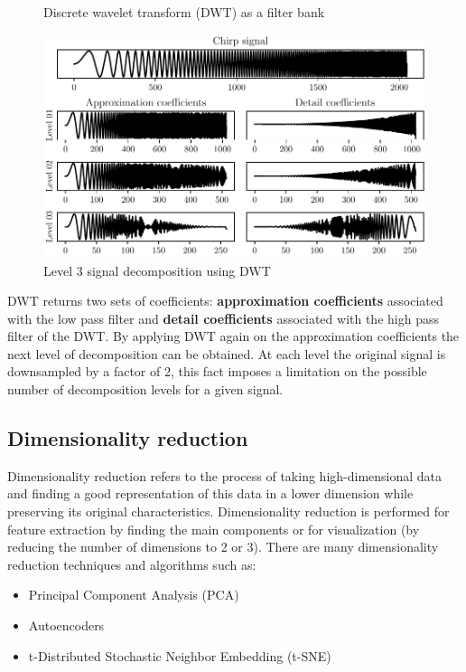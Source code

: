 \begin{figure}[H]
    \centering
    
    \caption{Discrete wavelet transform (DWT) as a filter bank}
    \label{fig:dwt}
\end{figure}

\begin{figure}[H]
    \centering
    \includegraphics{figures/dwt_chirp.pdf}
    \caption{Level 3 signal decomposition using DWT}
    \label{fig:dwt-chirp-signal}
\end{figure}

DWT returns two sets of coefficients: \textbf{approximation coefficients} associated with the low pass filter and \textbf{detail coefficients} associated with the high pass filter of the DWT. By applying DWT again on the approximation coefficients the next level of decomposition can be obtained. At each level the original signal is downsampled by a factor of 2, this fact imposes a limitation on the possible number of decomposition levels for a given signal.

\subsection{Dimensionality reduction}
\label{section:dimensionality-reduction}
Dimensionality reduction refers to the process of taking high-dimensional data and finding a good representation of this data in a lower dimension while preserving its original characteristics. Dimensionality reduction is performed for feature extraction by finding the main components or for visualization (by reducing the number of dimensions to 2 or 3).
There are many dimensionality reduction techniques and algorithms such as:
\begin{itemize}
    \item Principal Component Analysis (PCA)
    \item Autoencoders
    \item t-Distributed Stochastic Neighbor Embedding (t-SNE)
\end{itemize}

